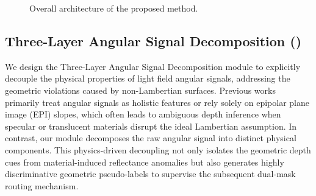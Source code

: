 \documentclass[lettersize,journal]{IEEEtran}
\begin{document}
\begin{figure}[!t]
\caption{Overall architecture of the proposed method.}
\label{fig:architecture}
\end{figure}

\subsection{Three-Layer Angular Signal Decomposition ()}

We design the Three-Layer Angular Signal Decomposition module to explicitly decouple the physical properties of light field angular signals, addressing the geometric violations caused by non-Lambertian surfaces. Previous works primarily treat angular signals as holistic features or rely solely on epipolar plane image (EPI) slopes, which often leads to ambiguous depth inference when specular or translucent materials disrupt the ideal Lambertian assumption. In contrast, our module decomposes the raw angular signal into distinct physical components. This physics-driven decoupling not only isolates the geometric depth cues from material-induced reflectance anomalies but also generates highly discriminative geometric pseudo-labels to supervise the subsequent dual-mask routing mechanism.
\end{document}
